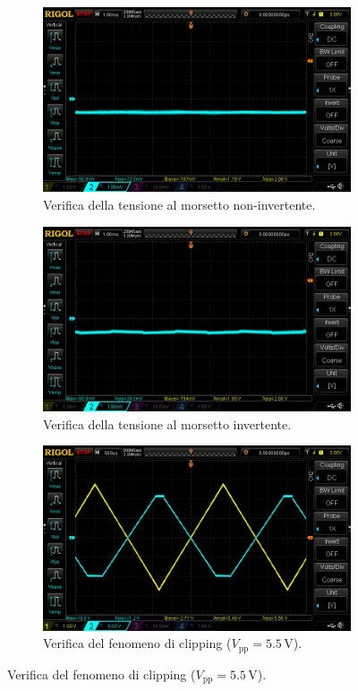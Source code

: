 \documentclass[a4paper]{article}
\begin{document}
			\begin{figure}[h!]
				\centering
				\begin{subfigure}{0.4\textwidth}
					\centering
					\includegraphics[scale=0.2]{tensioneMorsettoNonInvertente}
					\caption{Verifica della tensione al morsetto non-invertente.}
				\end{subfigure}
				\begin{subfigure}{0.4\textwidth}
					\centering
					\includegraphics[scale=0.2]{tensioneMorsettoInvertente}
					\caption{Verifica della tensione al morsetto invertente.}
				\end{subfigure}
				\begin{subfigure}{0.7\textwidth}
					\centering
					\includegraphics[scale=0.3]{clipping}
					\caption{Verifica del fenomeno di clipping ($ V_{\mathrm{pp}} = 5.5 \, \mathrm{V} $).}
				\end{subfigure}
				\label{fig:punto2.2.3}
			\end{figure}
\end{document}

